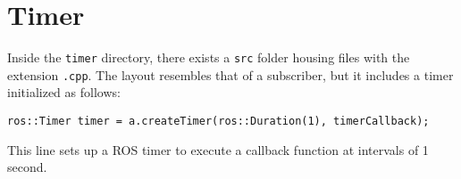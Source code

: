 \section{Timer}

Inside the \texttt{timer} directory, there exists a \texttt{src} folder housing files with the extension \texttt{.cpp}.
The layout resembles that of a subscriber, but it includes a timer initialized as follows:
\begin{verbatim}
ros::Timer timer = a.createTimer(ros::Duration(1), timerCallback);
\end{verbatim} 
This line sets up a ROS timer to execute a callback function at intervals of 1 second.